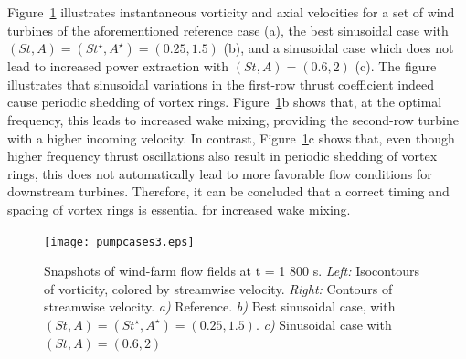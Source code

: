 \documentclass[wes, manuscript]{copernicus}
\begin{document}
Figure~\ref{fig:vorticity_parametersweep} illustrates instantaneous vorticity and axial velocities for a set of wind turbines of the aforementioned reference case (a), the best sinusoidal case with $(St, A) = (St^\star, A^\star)= (0.25, 1.5)$ (b), and a sinusoidal case which does not lead to increased power extraction with $(St, A) = (0.6, 2)$ (c). The figure illustrates that sinusoidal variations in the first-row thrust coefficient indeed cause periodic shedding of vortex rings. Figure~\ref{fig:vorticity_parametersweep}b shows that, at the optimal frequency, this leads to increased wake mixing, providing the second-row turbine with a higher incoming velocity. In contrast, Figure~\ref{fig:vorticity_parametersweep}c shows that, even though higher frequency thrust oscillations also result in periodic shedding of vortex rings, this does not automatically lead to more favorable flow conditions for downstream turbines. Therefore, it can be concluded that a correct timing and spacing of vortex rings is essential for increased wake mixing.
\begin{figure}
	\centering
	\texttt{[image: pumpcases3.eps]}
	\caption{Snapshots of wind-farm flow fields at t = 1 800 s. \emph{Left: } Isocontours of vorticity, colored by streamwise velocity. \emph{Right: } Contours of streamwise velocity. \emph{a)} Reference. \emph{b)} Best sinusoidal case, with $(St , A) = (St^\star, A^\star) = (0.25, 1.5)$. \emph{c)} Sinusoidal case with $(St, A) = (0.6, 2)$ \label{fig:vorticity_parametersweep}  }
\end{figure}
\end{document}
